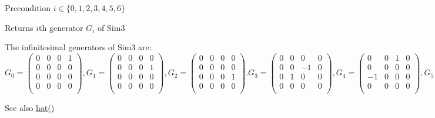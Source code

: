 \begin{DoxyPrecond}{Precondition}
$ i \in \{0,1,2,3,4,5,6\} $ 
\end{DoxyPrecond}
\begin{DoxyReturn}{Returns}
$ i $th generator $ G_i $ of Sim3
\end{DoxyReturn}
The infinitesimal generators of Sim3 are\+: \[ G_0 = \left( \begin{array}{cccc} 0& 0& 0& 1\\ 0& 0& 0& 0\\ 0& 0& 0& 0\\ 0& 0& 0& 0\\ \end{array} \right), G_1 = \left( \begin{array}{cccc} 0& 0& 0& 0\\ 0& 0& 0& 1\\ 0& 0& 0& 0\\ 0& 0& 0& 0\\ \end{array} \right), G_2 = \left( \begin{array}{cccc} 0& 0& 0& 0\\ 0& 0& 0& 0\\ 0& 0& 0& 1\\ 0& 0& 0& 0\\ \end{array} \right). G_3 = \left( \begin{array}{cccc} 0& 0& 0& 0\\ 0& 0& -1& 0\\ 0& 1& 0& 0\\ 0& 0& 0& 0\\ \end{array} \right), G_4 = \left( \begin{array}{cccc} 0& 0& 1& 0\\ 0& 0& 0& 0\\ -1& 0& 0& 0\\ 0& 0& 0& 0\\ \end{array} \right), G_5 = \left( \begin{array}{cccc} 0& -1& 0& 0\\ 1& 0& 0& 0\\ 0& 0& 0& 0\\ 0& 0& 0& 0\\ \end{array} \right), G_6 = \left( \begin{array}{cccc} 1& 0& 0& 0\\ 0& 1& 0& 0\\ 0& 0& 1& 0\\ 0& 0& 0& 0\\ \end{array} \right). \] \begin{DoxySeeAlso}{See also}
\hyperlink{class_sophus_1_1_sim3_group_base_a4260919b9987a953c96f1e363e36550b}{hat()} 
\end{DoxySeeAlso}


